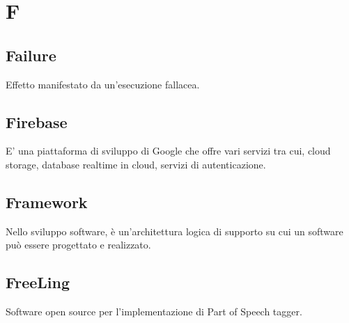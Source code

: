 \section*{F}

\subsection{Failure}
Effetto manifestato da un'esecuzione fallacea.

\subsection{Firebase}
E' una piattaforma di sviluppo di Google che offre vari servizi tra cui, cloud storage, database realtime in cloud, servizi di autenticazione.

\subsection{Framework}
Nello sviluppo software, è un'architettura logica di supporto su cui un software può essere progettato e realizzato.

\subsection{FreeLing}
Software open source per l'implementazione di Part of Speech tagger.